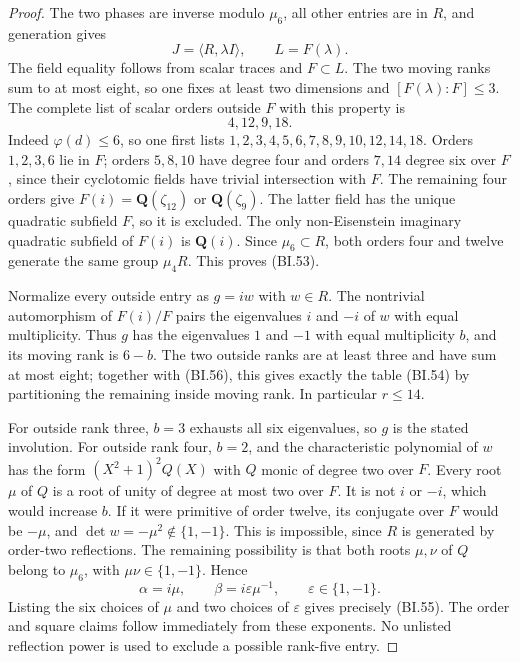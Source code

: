 \begin{proof}
The two phases are inverse modulo $\mu_6$, all other entries
are in $R$, and generation gives
\[
                   J=\langle R,\lambda I\rangle,
                   \qquad L=F(\lambda).                    \tag{BI.58}
\]
The field equality follows from scalar traces and $F\subset L$.
The two moving ranks sum to at most eight, so one fixes at least
two dimensions and $[F(\lambda):F]\le3$.  The complete list
of scalar orders outside $F$ with this property is
\[
                        4,12,9,18.                         \tag{BI.59}
\]
Indeed $\varphi(d)\le6$, so one first lists
$1,2,3,4,5,6,7,8,9,10,12,14,18$.  Orders $1,2,3,6$ lie in $F$;
orders $5,8,10$ have degree four and orders $7,14$ degree six
over $F$, since their cyclotomic fields have trivial intersection
with $F$.  The remaining four
orders give $F(i)=\mathbf Q(\zeta_{12})$ or
$\mathbf Q(\zeta_9)$.  The latter field has the unique
quadratic subfield $F$, so it is excluded.  The only
non-Eisenstein imaginary quadratic subfield of $F(i)$ is
$\mathbf Q(i)$.  Since $\mu_6\subset R$, both orders four
and twelve generate the same group $\mu_4R$.  This proves
(BI.53).

Normalize every outside entry as $g=iw$ with $w\in R$.
The nontrivial automorphism of $F(i)/F$ pairs the eigenvalues
$i$ and $-i$ of $w$ with equal multiplicity.  Thus $g$ has
the eigenvalues $1$ and $-1$ with equal multiplicity $b$,
and its moving rank is $6-b$.  The two outside ranks are at
least three and have sum at most eight; together with (BI.56),
this gives exactly the table (BI.54) by partitioning the
remaining inside moving rank.  In particular $r\le14$.

For outside rank three, $b=3$ exhausts all six eigenvalues,
so $g$ is the stated involution.  For outside rank four,
$b=2$, and the characteristic polynomial of $w$ has the form
$(X^2+1)^2Q(X)$ with $Q$ monic of degree two over $F$.
Every root $\mu$ of $Q$ is a root of unity of degree at most
two over $F$.  It is not $i$ or $-i$, which would increase
$b$.  If it were primitive of order twelve, its conjugate
over $F$ would be $-\mu$, and
$\det w=-\mu^2\notin\{1,-1\}$.  This is impossible,
since $R$ is generated by order-two reflections.  The remaining
possibility is that both roots $\mu,\nu$ of $Q$ belong to
$\mu_6$, with $\mu\nu\in\{1,-1\}$.  Hence
\[
                  \alpha=i\mu,\qquad
                  \beta=i\varepsilon\mu^{-1},
                  \qquad\varepsilon\in\{1,-1\}.
\]
Listing the six choices of $\mu$ and two choices of
$\varepsilon$ gives precisely (BI.55).  The order and square
claims follow immediately from these exponents.  No unlisted
reflection power is used to exclude a possible rank-five entry.
\end{proof}

